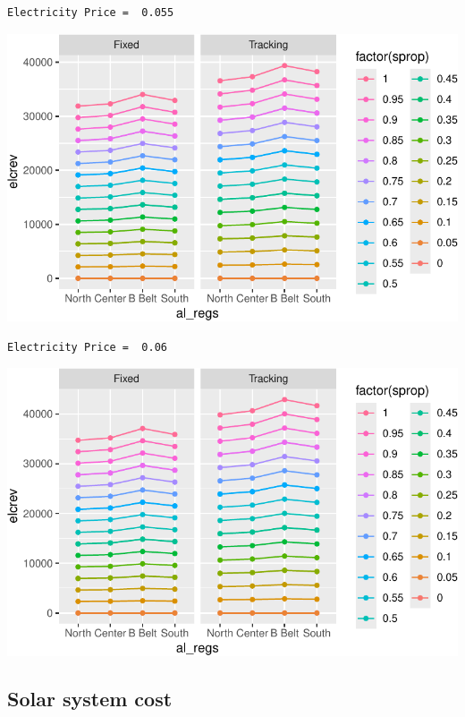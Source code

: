 \documentclass[
  letterpaper,
  DIV=11,
  numbers=noendperiod]{scrartcl}
\begin{document}
\begin{verbatim}
Electricity Price =  0.055
\end{verbatim}

\includegraphics{Simulation_files/figure-pdf/unnamed-chunk-21-10.pdf}

\begin{verbatim}
Electricity Price =  0.06
\end{verbatim}

\includegraphics{Simulation_files/figure-pdf/unnamed-chunk-21-11.pdf}

\subsection{Solar system cost}\label{solar-system-cost}
\end{document}
